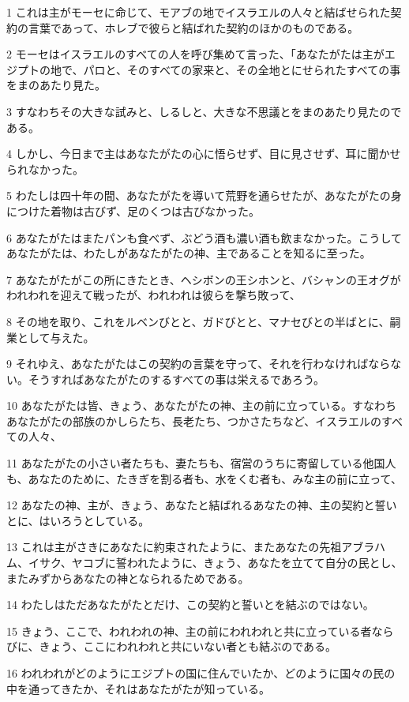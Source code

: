 \par 1 これは主がモーセに命じて、モアブの地でイスラエルの人々と結ばせられた契約の言葉であって、ホレブで彼らと結ばれた契約のほかのものである。
\par 2 モーセはイスラエルのすべての人を呼び集めて言った、「あなたがたは主がエジプトの地で、パロと、そのすべての家来と、その全地とにせられたすべての事をまのあたり見た。
\par 3 すなわちその大きな試みと、しるしと、大きな不思議とをまのあたり見たのである。
\par 4 しかし、今日まで主はあなたがたの心に悟らせず、目に見させず、耳に聞かせられなかった。
\par 5 わたしは四十年の間、あなたがたを導いて荒野を通らせたが、あなたがたの身につけた着物は古びず、足のくつは古びなかった。
\par 6 あなたがたはまたパンも食べず、ぶどう酒も濃い酒も飲まなかった。こうしてあなたがたは、わたしがあなたがたの神、主であることを知るに至った。
\par 7 あなたがたがこの所にきたとき、ヘシボンの王シホンと、バシャンの王オグがわれわれを迎えて戦ったが、われわれは彼らを撃ち敗って、
\par 8 その地を取り、これをルベンびとと、ガドびとと、マナセびとの半ばとに、嗣業として与えた。
\par 9 それゆえ、あなたがたはこの契約の言葉を守って、それを行わなければならない。そうすればあなたがたのするすべての事は栄えるであろう。
\par 10 あなたがたは皆、きょう、あなたがたの神、主の前に立っている。すなわちあなたがたの部族のかしらたち、長老たち、つかさたちなど、イスラエルのすべての人々、
\par 11 あなたがたの小さい者たちも、妻たちも、宿営のうちに寄留している他国人も、あなたのために、たきぎを割る者も、水をくむ者も、みな主の前に立って、
\par 12 あなたの神、主が、きょう、あなたと結ばれるあなたの神、主の契約と誓いとに、はいろうとしている。
\par 13 これは主がさきにあなたに約束されたように、またあなたの先祖アブラハム、イサク、ヤコブに誓われたように、きょう、あなたを立てて自分の民とし、またみずからあなたの神となられるためである。
\par 14 わたしはただあなたがたとだけ、この契約と誓いとを結ぶのではない。
\par 15 きょう、ここで、われわれの神、主の前にわれわれと共に立っている者ならびに、きょう、ここにわれわれと共にいない者とも結ぶのである。
\par 16 われわれがどのようにエジプトの国に住んでいたか、どのように国々の民の中を通ってきたか、それはあなたがたが知っている。
